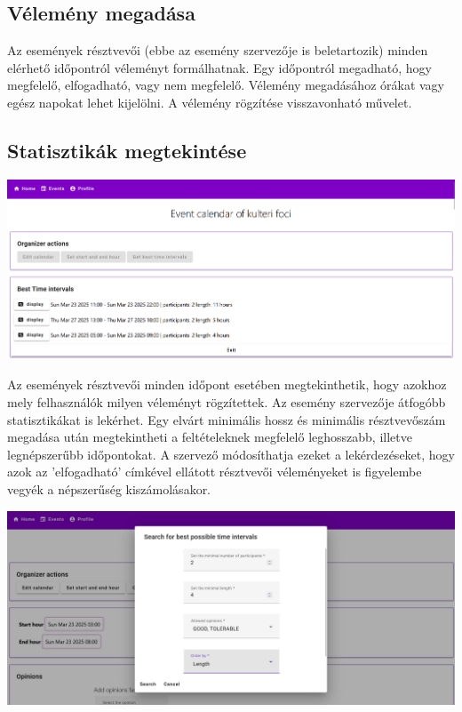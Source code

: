 \documentclass[a4paper,12pt]{report}
\theoremstyle{definition}
\theoremstyle{remark}
\begin{document}
	\subsection{Vélemény megadása}

Az események résztvevői (ebbe az esemény szervezője is beletartozik) minden elérhető időpontról véleményt formálhatnak. Egy időpontról megadható, hogy megfelelő, elfogadható, vagy nem megfelelő. Vélemény megadásához órákat vagy egész napokat lehet kijelölni. A vélemény rögzítése visszavonható művelet.

	\subsection{Statisztikák megtekintése}

\begin{center}
\includegraphics[width=150mm]{best_time_intervals}
\captionsetup{width=0.8\linewidth}
\end{center}

Az események résztvevői minden időpont esetében megtekinthetik, hogy azokhoz mely felhasználók milyen véleményt rögzítettek. Az esemény szervezője átfogóbb statisztikákat is lekérhet. Egy elvárt minimális hossz és minimális résztvevőszám megadása után megtekintheti a feltételeknek megfelelő leghosszabb, illetve legnépszerűbb időpontokat. A szervező módosíthatja ezeket a lekérdezéseket, hogy azok az 'elfogadható' címkével ellátott résztvevői véleményeket is figyelembe vegyék a népszerűség kiszámolásakor.

\begin{center}
\includegraphics[width=150mm]{get_best_dialog}
\captionsetup{width=0.8\linewidth}
\end{center}
\end{document}

